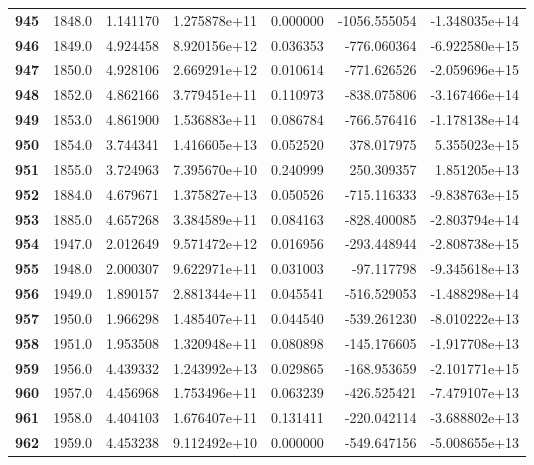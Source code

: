 \documentclass{report}[12pt]
\begin{document}
\begin{center}
\begin{tabular}{lrrrrrr}
\textbf{945 } &         1848.0 &   1.141170 &  1.275878e+11 &    0.000000 & -1056.555054 & -1.348035e+14 \\
\textbf{946 } &         1849.0 &   4.924458 &  8.920156e+12 &    0.036353 &  -776.060364 & -6.922580e+15 \\
\textbf{947 } &         1850.0 &   4.928106 &  2.669291e+12 &    0.010614 &  -771.626526 & -2.059696e+15 \\
\textbf{948 } &         1852.0 &   4.862166 &  3.779451e+11 &    0.110973 &  -838.075806 & -3.167466e+14 \\
\textbf{949 } &         1853.0 &   4.861900 &  1.536883e+11 &    0.086784 &  -766.576416 & -1.178138e+14 \\
\textbf{950 } &         1854.0 &   3.744341 &  1.416605e+13 &    0.052520 &   378.017975 &  5.355023e+15 \\
\textbf{951 } &         1855.0 &   3.724963 &  7.395670e+10 &    0.240999 &   250.309357 &  1.851205e+13 \\
\textbf{952 } &         1884.0 &   4.679671 &  1.375827e+13 &    0.050526 &  -715.116333 & -9.838763e+15 \\
\textbf{953 } &         1885.0 &   4.657268 &  3.384589e+11 &    0.084163 &  -828.400085 & -2.803794e+14 \\
\textbf{954 } &         1947.0 &   2.012649 &  9.571472e+12 &    0.016956 &  -293.448944 & -2.808738e+15 \\
\textbf{955 } &         1948.0 &   2.000307 &  9.622971e+11 &    0.031003 &   -97.117798 & -9.345618e+13 \\
\textbf{956 } &         1949.0 &   1.890157 &  2.881344e+11 &    0.045541 &  -516.529053 & -1.488298e+14 \\
\textbf{957 } &         1950.0 &   1.966298 &  1.485407e+11 &    0.044540 &  -539.261230 & -8.010222e+13 \\
\textbf{958 } &         1951.0 &   1.953508 &  1.320948e+11 &    0.080898 &  -145.176605 & -1.917708e+13 \\
\textbf{959 } &         1956.0 &   4.439332 &  1.243992e+13 &    0.029865 &  -168.953659 & -2.101771e+15 \\
\textbf{960 } &         1957.0 &   4.456968 &  1.753496e+11 &    0.063239 &  -426.525421 & -7.479107e+13 \\
\textbf{961 } &         1958.0 &   4.404103 &  1.676407e+11 &    0.131411 &  -220.042114 & -3.688802e+13 \\
\textbf{962 } &         1959.0 &   4.453238 &  9.112492e+10 &    0.000000 &  -549.647156 & -5.008655e+13 \\

\end{tabular}
\end{center}
\end{document}
